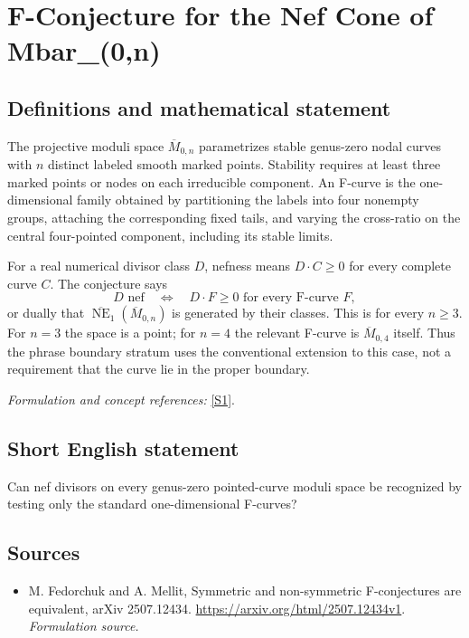 \documentclass[11pt]{article}
\begin{document}
\section*{\texorpdfstring{F-Conjecture for the Nef Cone of Mbar\_(0,n)}{F-Conjecture for the Nef Cone of Mbar\_(0,n)}}\label{30006972}
\subsection{Definitions and mathematical statement}
The projective moduli space $\overline M_{0,n}$ parametrizes stable genus-zero nodal curves with $n$ distinct labeled smooth marked points. Stability requires at least three marked points or nodes on each irreducible component. An F-curve is the one-dimensional family obtained by partitioning the labels into four nonempty groups, attaching the corresponding fixed tails, and varying the cross-ratio on the central four-pointed component, including its stable limits.

For a real numerical divisor class $D$, nefness means $D\cdot C\ge0$ for every complete curve $C$. The conjecture says
\[
 D\text{ nef}\quad\Longleftrightarrow\quad
 D\cdot F\ge0\text{ for every F-curve }F,
\]
or dually that $\overline{\operatorname{NE}}_1(\overline M_{0,n})$ is generated by their classes. This is for every $n\ge3$. For $n=3$ the space is a point; for $n=4$ the relevant F-curve is $\overline M_{0,4}$ itself. Thus the phrase boundary stratum uses the conventional extension to this case, not a requirement that the curve lie in the proper boundary.
\par\smallskip\textit{Formulation and concept references:} \href{https://arxiv.org/html/2507.12434v1}{[S1]}.

\subsection{Short English statement}
Can nef divisors on every genus-zero pointed-curve moduli space be recognized by testing only the standard one-dimensional F-curves?
\subsection{Sources}
\begin{itemize}
\item[S1]M. Fedorchuk and A. Mellit, Symmetric and non-symmetric F-conjectures are equivalent, arXiv 2507.12434.
\url{https://arxiv.org/html/2507.12434v1}.
\textit{Formulation source.}
\end{itemize}
\end{document}
